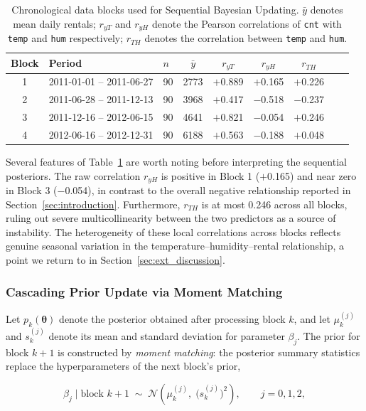 \begin{table}[htbp]
\centering
\caption{Chronological data blocks used for Sequential Bayesian Updating.
$\bar{y}$ denotes mean daily rentals; $r_{yT}$ and $r_{yH}$ denote the
Pearson correlations of \texttt{cnt} with \texttt{temp} and \texttt{hum}
respectively; $r_{TH}$ denotes the correlation between \texttt{temp} and
\texttt{hum}.}
\label{tab:chunks}
\begin{tabular}{cllcccccc}
\hline
Block & Period & $n$ & $\bar{y}$ & $r_{yT}$ & $r_{yH}$ & $r_{TH}$ \\
\hline
1 & 2011-01-01 -- 2011-06-27 & 90 & 2773 & $+$0.889 & $+$0.165 & $+$0.226 \\
2 & 2011-06-28 -- 2011-12-13 & 90 & 3968 & $+$0.417 & $-$0.518 & $-$0.237 \\
3 & 2011-12-16 -- 2012-06-15 & 90 & 4641 & $+$0.821 & $-$0.054 & $+$0.246 \\
4 & 2012-06-16 -- 2012-12-31 & 90 & 6188 & $+$0.563 & $-$0.188 & $+$0.048 \\
\hline
\end{tabular}
\end{table}

Several features of Table~\ref{tab:chunks} are worth noting before interpreting the
sequential posteriors. The raw correlation $r_{yH}$ is positive in Block 1
($+$0.165) and near zero in Block 3 ($-$0.054), in contrast to the overall
negative relationship reported in Section~\ref{sec:introduction}. Furthermore,
$r_{TH}$ is at most 0.246 across all blocks, ruling out severe multicollinearity
between the two predictors as a source of instability. The heterogeneity of these
local correlations across blocks reflects genuine seasonal variation in the
temperature--humidity--rental relationship, a point we return to in
Section~\ref{sec:ext_discussion}.

\subsubsection{Cascading Prior Update via Moment Matching}

Let $p_k(\boldsymbol{\theta})$ denote the posterior obtained after processing
block $k$, and let $\mu_k^{(j)}$ and $s_k^{(j)}$ denote its mean and standard
deviation for parameter $\beta_j$. The prior for block $k+1$ is constructed by
\emph{moment matching}: the posterior summary statistics replace the
hyperparameters of the next block's prior,

\begin{equation}
    \beta_j \mid \text{block } k+1 \;\sim\;
    \mathcal{N}\!\left(\mu_k^{(j)},\; \bigl(s_k^{(j)}\bigr)^2\right),
    \qquad j = 0, 1, 2,
    \label{eq:moment_match_beta}
\end{equation}

